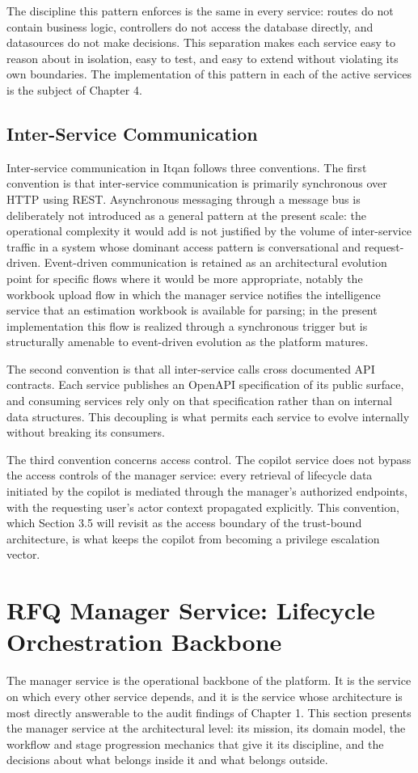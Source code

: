 The discipline this pattern enforces is the same in every service: routes do not contain business logic, controllers do not access the database directly, and datasources do not make decisions. This separation makes each service easy to reason about in isolation, easy to test, and easy to extend without violating its own boundaries. The implementation of this pattern in each of the active services is the subject of Chapter 4.

\subsection*{Inter-Service Communication}
Inter-service communication in Itqan follows three conventions. The first convention is that inter-service communication is primarily synchronous over HTTP using REST. Asynchronous messaging through a message bus is deliberately not introduced as a general pattern at the present scale: the operational complexity it would add is not justified by the volume of inter-service traffic in a system whose dominant access pattern is conversational and request-driven. Event-driven communication is retained as an architectural evolution point for specific flows where it would be more appropriate, notably the workbook upload flow in which the manager service notifies the intelligence service that an estimation workbook is available for parsing; in the present implementation this flow is realized through a synchronous trigger but is structurally amenable to event-driven evolution as the platform matures.

The second convention is that all inter-service calls cross documented API contracts. Each service publishes an OpenAPI specification of its public surface, and consuming services rely only on that specification rather than on internal data structures. This decoupling is what permits each service to evolve internally without breaking its consumers.

The third convention concerns access control. The copilot service does not bypass the access controls of the manager service: every retrieval of lifecycle data initiated by the copilot is mediated through the manager's authorized endpoints, with the requesting user's actor context propagated explicitly. This convention, which Section 3.5 will revisit as the access boundary of the trust-bound architecture, is what keeps the copilot from becoming a privilege escalation vector.

\section{RFQ Manager Service: Lifecycle Orchestration Backbone}
The manager service is the operational backbone of the platform. It is the service on which every other service depends, and it is the service whose architecture is most directly answerable to the audit findings of Chapter 1. This section presents the manager service at the architectural level: its mission, its domain model, the workflow and stage progression mechanics that give it its discipline, and the decisions about what belongs inside it and what belongs outside.

